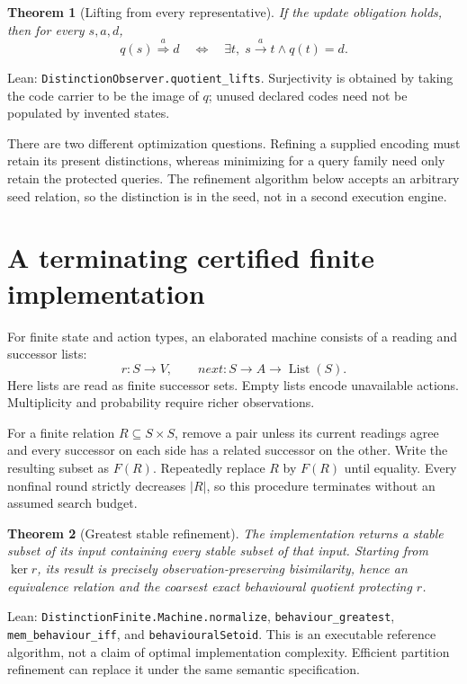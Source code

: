 \documentclass[11pt]{article}
\newtheorem{theorem}{Theorem}
\newcommand{\lean}[1]{\nolinkurl{#1}}
\begin{document}
\begin{theorem}[Lifting from every representative]
If the update obligation holds, then for every $s,a,d$,
\[
q(s)\overset{a}{\Longrightarrow}d
\quad\Longleftrightarrow\quad
\exists t,\;s\xrightarrow{a}t\land q(t)=d.
\]
\end{theorem}
\noindent Lean: \lean{DistinctionObserver.quotient_lifts}.
Surjectivity is obtained by taking the code carrier to be the image of $q$;
unused declared codes need not be populated by invented states.

There are two different optimization questions. Refining a supplied encoding
must retain its present distinctions, whereas minimizing for a query family
need only retain the protected queries. The refinement algorithm below accepts
an arbitrary seed relation, so the distinction is in the seed, not in a second
execution engine.

\section{A terminating certified finite implementation}
For finite state and action types, an elaborated machine consists of a reading
and successor lists:
\[
  r:S\to V,\qquad \mathit{next}:S\to A\to\operatorname{List}(S).
\]
Here lists are read as finite successor sets. Empty lists encode unavailable
actions. Multiplicity and probability require richer observations.

For a finite relation $R\subseteq S\times S$, remove a pair unless its current
readings agree and every successor on each side has a related successor on the
other. Write the resulting subset as $F(R)$. Repeatedly replace $R$ by $F(R)$
until equality. Every nonfinal round strictly decreases $|R|$, so this
procedure terminates without an assumed search budget.

\begin{theorem}[Greatest stable refinement]
The implementation returns a stable subset of its input containing every
stable subset of that input. Starting from $\ker r$, its result is precisely
observation-preserving bisimilarity, hence an equivalence relation and the
coarsest exact behavioural quotient protecting $r$.
\end{theorem}
\noindent Lean: \lean{DistinctionFinite.Machine.normalize},
\lean{behaviour_greatest}, \lean{mem_behaviour_iff}, and
\lean{behaviouralSetoid}. This is an executable reference algorithm, not a
claim of optimal implementation complexity. Efficient partition refinement
can replace it under the same semantic specification.
\end{document}
